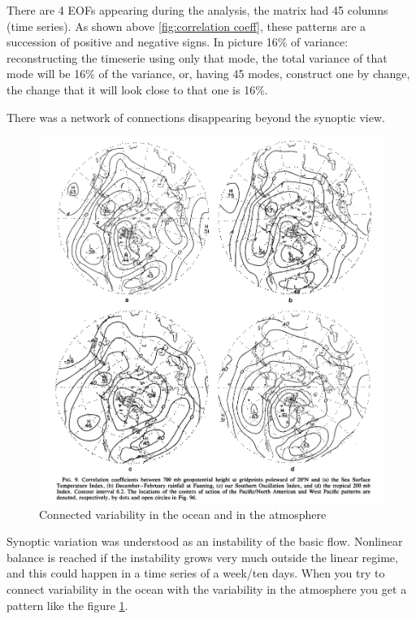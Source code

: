 There are 4 EOFs appearing during the analysis, the matrix had 45 columns (time series). As shown above \ref{fig:correlation coeff}, these patterns are a succession of positive and negative signs. In picture 16\% of variance: reconstructing the timeserie using only that mode, the total variance of that mode will be 16\% of the variance, or, having 45 modes, construct one by change, the change that it will look close to that one is 16\%.

There was a network of connections disappearing beyond the synoptic view. 
\begin{figure}[htp!]
    \centering
    \includegraphics[width=0.4\linewidth]{uploads/imageexploringvar.png}
    \caption{Connected variability in the ocean and in the atmosphere}
    \label{fig:conn var}
\end{figure}


Synoptic variation was understood as an instability of the basic flow. Nonlinear balance is reached if the instability grows very much outside the linear regime, and this could happen in a time series of a week/ten days. 
When you try to connect variability in the ocean with the variability in the atmosphere you get a pattern like the figure \ref{fig:conn var}.






